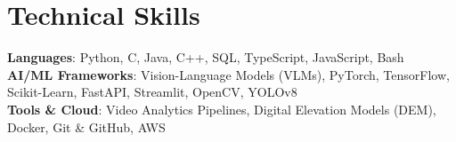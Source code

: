 \documentclass[letterpaper,11pt]{article}
\begin{document}
\section{Technical Skills}
 \begin{itemize}[leftmargin=0.15in, label={}]
    \small{\item{
     \textbf{Languages}{: Python, C, Java, C++, SQL, TypeScript, JavaScript, Bash} \\
     \textbf{AI/ML Frameworks}{: Vision-Language Models (VLMs), PyTorch, TensorFlow, Scikit-Learn, FastAPI, Streamlit, OpenCV, YOLOv8} \\
     \textbf{Tools \& Cloud}{: Video Analytics Pipelines, Digital Elevation Models (DEM), Docker, Git \& GitHub, AWS}
    }}
 \end{itemize}
\end{document}
